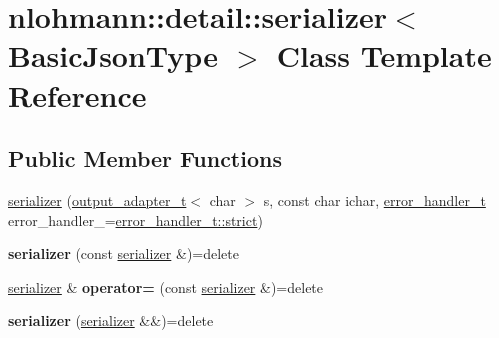 \hypertarget{classnlohmann_1_1detail_1_1serializer}{}\section{nlohmann\+:\+:detail\+:\+:serializer$<$ Basic\+Json\+Type $>$ Class Template Reference}
\label{classnlohmann_1_1detail_1_1serializer}
\subsection*{Public Member Functions}
\begin{DoxyCompactItemize}
\item 
\mbox{\hyperlink{classnlohmann_1_1detail_1_1serializer_ac010525281d97867ee842da37294fe83}{serializer}} (\mbox{\hyperlink{namespacenlohmann_1_1detail_a9b680ddfb58f27eb53a67229447fc556}{output\+\_\+adapter\+\_\+t}}$<$ char $>$ s, const char ichar, \mbox{\hyperlink{namespacenlohmann_1_1detail_a5a76b60b26dc8c47256a996d18d967df}{error\+\_\+handler\+\_\+t}} error\+\_\+handler\+\_\+=\mbox{\hyperlink{namespacenlohmann_1_1detail_a5a76b60b26dc8c47256a996d18d967dfa2133fd717402a7966ee88d06f9e0b792}{error\+\_\+handler\+\_\+t\+::strict}})
\item 
\mbox{\label{classnlohmann_1_1detail_1_1serializer_ae3771351ec4cb892bec707edeb56dc31}} 
{\bfseries serializer} (const \mbox{\hyperlink{classnlohmann_1_1detail_1_1serializer}{serializer}} \&)=delete
\item 
\mbox{\label{classnlohmann_1_1detail_1_1serializer_a5f14c33012477b9f9876dc54d97009a0}} 
\mbox{\hyperlink{classnlohmann_1_1detail_1_1serializer}{serializer}} \& {\bfseries operator=} (const \mbox{\hyperlink{classnlohmann_1_1detail_1_1serializer}{serializer}} \&)=delete
\item 
\mbox{\label{classnlohmann_1_1detail_1_1serializer_a28081304e70cca6b3042c101ee5c498c}} 
{\bfseries serializer} (\mbox{\hyperlink{classnlohmann_1_1detail_1_1serializer}{serializer}} \&\&)=delete
\item 
\mbox{\label{classnlohmann_1_1detail_1_1serializer_acaafe3436ee5fb74777eb4132a88c513}} 

\end{DoxyCompactItemize}
